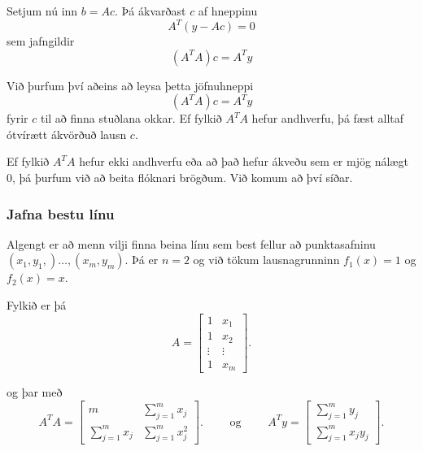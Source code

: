 \documentclass[icelandic,a4paper,12pt]{article}
\begin{document}
\pause
\smallskip
Setjum nú inn $b=Ac$. Þá ákvarðast $c$ af hneppinu
\begin{equation*}
A^T(y-Ac) = 0
\end{equation*}
sem jafngildir
\begin{equation*}
	(A^TA)c = A^Ty
\end{equation*}


Við þurfum því aðeins að leysa þetta jöfnuhneppi 
\begin{equation*}
	(A^TA)c = A^Ty
\end{equation*}
fyrir $c$ til að
finna stuðlana okkar.   Ef fylkið $A^TA$ hefur andhverfu, þá fæst
alltaf ótvírætt ákvörðuð lausn $c$.

\pause
\smallskip
Ef fylkið $A^TA$  hefur ekki andhverfu eða að það hefur ákveðu sem er
mjög nálægt $0$, þá þurfum við að beita flóknari brögðum.  Við komum
að því síðar.


\subsubsection{Jafna bestu línu}
Algengt er að menn vilji  finna beina línu sem best fellur að 
punktasafninu $(x_1,y_1,)\dots,(x_m,y_m)$.  Þá er 
$n=2$ og við tökum lausnagrunninn $f_1(x)=1$ og $f_2(x)=x$.

\pause
\smallskip
Fylkið er þá
\begin{equation*}
	A = \left[\begin{matrix} 
		1& x_1\\
		1& x_2 \\
		\vdots &\vdots \\
		1& x_m 
	\end{matrix}\right].
\end{equation*}

\pause
\smallskip
og þar með
\begin{equation*}
	A^TA = \left[\begin{matrix} 
		m& \sum_{j=1}^mx_j\\
		\sum_{j=1}^mx_j& \sum_{j=1}^mx_j^2 
	\end{matrix}\right].
\qquad \text{ og } \qquad
	A^Ty = \left[\begin{matrix} 
		 \sum_{j=1}^my_j\\
		\sum_{j=1}^mx_jy_j
	\end{matrix}\right].
\end{equation*}
\end{document}
